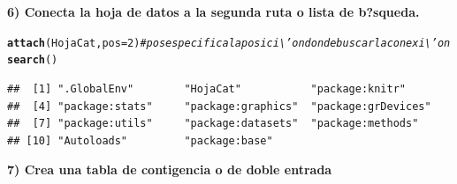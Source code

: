 \documentclass[12pt,letterpaper]{article}\usepackage[]{graphicx}\usepackage[]{color}
\makeatletter
\newcommand{\hlnum}[1]{\textcolor[rgb]{0.686,0.059,0.569}{#1}}%
\newcommand{\hlcom}[1]{\textcolor[rgb]{0.678,0.584,0.686}{\textit{#1}}}%
\newcommand{\hlstd}[1]{\textcolor[rgb]{0.345,0.345,0.345}{#1}}%
\newcommand{\hlkwc}[1]{\textcolor[rgb]{0.333,0.667,0.333}{#1}}%
\newcommand{\hlkwd}[1]{\textcolor[rgb]{0.737,0.353,0.396}{\textbf{#1}}}%
\newenvironment{kframe}{%
 \def\at@end@of@kframe{}%
 \ifinner\ifhmode%
  \def\at@end@of@kframe{\end{minipage}}%
  \begin{minipage}{\columnwidth}%
 \fi\fi%
 \def\FrameCommand##1{\hskip\@totalleftmargin \hskip-\fboxsep
 \colorbox{shadecolor}{##1}\hskip-\fboxsep
     \hskip-\linewidth \hskip-\@totalleftmargin \hskip\columnwidth}%
 \MakeFramed {\advance\hsize-\width
   \@totalleftmargin\z@ \linewidth\hsize
   \@setminipage}}%
 {\par\unskip\endMakeFramed%
 \at@end@of@kframe}
\newenvironment{knitrout}{}{} %
\makeatother
\begin{document}
\textbf{6) Conecta la hoja de datos a la segunda ruta o lista de b?squeda.} 
\begin{knitrout}
\color{fgcolor}\begin{kframe}
\begin{alltt}
\hlkwd{attach}\hlstd{(HojaCat,} \hlkwc{pos}\hlstd{=}\hlnum{2}\hlstd{)} \hlcom{# pos especifica la posici\textbackslash{}'on donde buscar la conexi\textbackslash{}'on}
\hlkwd{search}\hlstd{()}
\end{alltt}
\begin{verbatim}
##  [1] ".GlobalEnv"        "HojaCat"           "package:knitr"    
##  [4] "package:stats"     "package:graphics"  "package:grDevices"
##  [7] "package:utils"     "package:datasets"  "package:methods"  
## [10] "Autoloads"         "package:base"
\end{verbatim}
\end{kframe}
\end{knitrout}
\textbf{7) Crea una tabla de contigencia o de doble entrada} 
\end{document}
